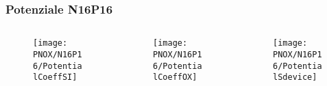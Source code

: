 \begin{frame}
\frametitle{Potenziale N16P16}
\begin{columns}

\begin{column}{0.3 \textwidth}
\begin{center}
\begin{figure}[!h]
          {\texttt{[image: PNOX/N16P16/PotentialCoeffSI]}}
          \end{figure}
\end{center}
\end{column}

\begin{column}{0.3 \textwidth}
\begin{center}
\begin{figure}[!h]
          {\texttt{[image: PNOX/N16P16/PotentialCoeffOX]}}
\end{figure}
\end{center}
\end{column}

\begin{column}{0.3 \textwidth}
\begin{center}
\begin{figure}[!h]
          {\texttt{[image: PNOX/N16P16/PotentialSdevice]}}
\end{figure}
\end{center}
\end{column}

\end{columns}

\end{frame}

